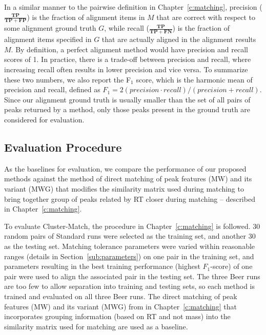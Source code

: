 In a similar manner to the pairwise definition in Chapter~\ref{c:matching}, precision ($\frac{\boldsymbol{TP}}{\boldsymbol{TP}+\boldsymbol{FP}}$) is the fraction of alignment items in $M$ that are correct with respect to some alignment ground truth $G$, while recall ($\frac{\boldsymbol{TP}}{\boldsymbol{TP}+\boldsymbol{FN}}$) is the fraction of alignment items specified in $G$ that are actually aligned in the alignment results $M$. By definition, a perfect alignment method would have precision and recall scores of 1. In practice, there is a trade-off between precision and recall, where increasing recall often results in lower precision and vice versa. To summarize these two numbers, we also report the F$_1$ score, which is the harmonic mean of precision and recall, defined as $F_1 = 2(precision\cdot recall)/(precision + recall)$. Since our alignment ground truth is usually smaller than the set of all pairs of peaks returned by a method, only those peaks present in the ground truth are considered for evaluation. 

\subsection{Evaluation Procedure\label{sub:evaluation_procedure}}

As the baselines for evaluation, we compare the performance of our proposed methods against the method of direct matching of peak features (MW) and its variant (MWG) that modifies the similarity matrix used during matching to bring together group of peaks related by RT closer during matching -- described in Chapter~\ref{c:matching}. 

To evaluate Cluster-Match, the procedure in Chapter~\ref{c:matching} is followed. 30 random pairs of Standard runs were selected as the training set, and another 30 as the testing set. Matching tolerance parameters were varied within reasonable ranges (details in Section~\ref{sub:parameters}) on one pair in the training set, and parameters resulting in the best training performance (highest $F_1$-score) of one pair were used to align the associated pair in the testing set. The three Beer runs are too few to allow separation into training and testing sets, so each method is trained and evaluated on all three Beer runs. The direct matching of peak features (MW) and its variant (MWG) from in Chapter~\ref{c:matching} that incorporates grouping information (based on RT and not mass) into the similarity matrix used for matching are used as a baseline. 

